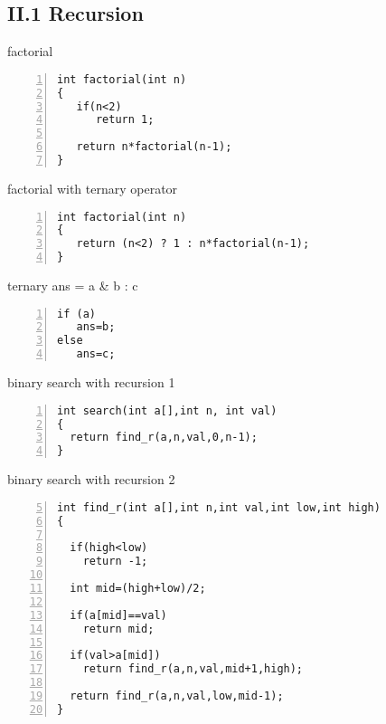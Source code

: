 \documentclass{beamer}
\begin{document}
\subsection*{II.1 Recursion}
\begin{frame}[fragile]{factorial}
\begin{lstlisting}[numbers=left]
int factorial(int n)
{
   if(n<2)
      return 1;

   return n*factorial(n-1);
}
\end{lstlisting}
\end{frame}


\begin{frame}[fragile]{factorial with ternary operator}
\begin{lstlisting}[numbers=left]
int factorial(int n)
{
   return (n<2) ? 1 : n*factorial(n-1);
}
\end{lstlisting}
\end{frame}


\begin{frame}[fragile]{ternary ans = a \& b : c }
\begin{lstlisting}[numbers=left]
if (a)
   ans=b;
else 
   ans=c;
\end{lstlisting}
\end{frame}




\begin{frame}[fragile]{binary search with recursion 1}
\begin{lstlisting}[numbers=left]
int search(int a[],int n, int val)
{
  return find_r(a,n,val,0,n-1);
}
\end{lstlisting}
\end{frame}

\begin{frame} [fragile]{binary search with recursion 2}
\begin{lstlisting}[numbers=left,firstnumber=5]
int find_r(int a[],int n,int val,int low,int high)
{

  if(high<low)
    return -1;

  int mid=(high+low)/2;

  if(a[mid]==val)
    return mid;

  if(val>a[mid])
    return find_r(a,n,val,mid+1,high);
  
  return find_r(a,n,val,low,mid-1);
}
\end{lstlisting}
\end{frame}
\end{document}
